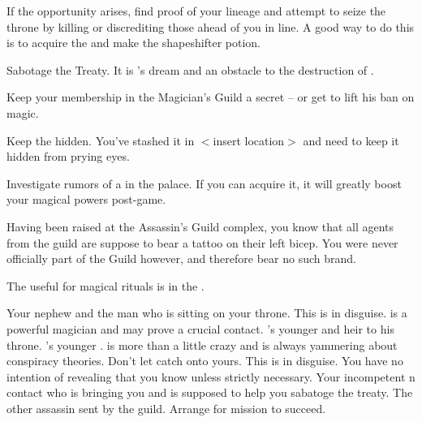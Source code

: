 \documentclass[char]{NeptuneBall}
\begin{document}
\begin{itemz}[Goals]
  \item If the opportunity arises, find proof of your lineage and attempt to seize the throne by killing or discrediting those ahead of you in line. A good way to do this is to acquire the \iHemlock{} and make the shapeshifter potion.
  \item Sabotage the Treaty. It is \cKing{}'s dream and an obstacle to the destruction of \pAtlantis{}.
  \item Keep your membership in the Magician's Guild a secret -- or get \cKing{\King} \cKing{} to lift his ban on magic.
  \item Keep the \iMusicBox{} hidden. You've stashed it in $<$insert location$>$ and need to keep it hidden from prying eyes.
  \item Investigate rumors of a \iGlowShell{\MYname} in the palace. If you can acquire it, it will greatly boost your magical powers post-game.
\end{itemz}

\begin{itemz}[Notes]
  \item Having been raised at the Assassin's Guild complex, you know that all agents from the guild are suppose to bear a tattoo on their left bicep. You were never officially part of the Guild however, and therefore bear no such brand.
	\item The \sRunicCircle{} useful for magical rituals is in the \pCaves{}.
\end{itemz}

\begin{contacts}
  \contact{\cKing{}} Your nephew and the man who is sitting on your throne.
  \contact{\cWitch{\MYname}} This is \cWitch{} in disguise. \cWitch{\They} is a powerful magician and may prove a crucial contact.
  \contact{\cPrincess{}} \cKing{}'s younger \cPrincess{\offspring} and heir to his throne.
  \contact{\cPlant{}} \cKing{}'s younger \cPlant{\sibling}. \cPlant{\they} is more than a little crazy and is always yammering about conspiracy theories. Don't let \cPlant{\them} catch onto yours.
  \contact{\cQueen{\MYname}} This is \cQueen{} in disguise. You have no intention of revealing that you know \cQueen{\them} unless strictly necessary.
  \contact{\cSpy{}} Your incompetent \pPacifica{}n contact who is bringing you \iHemlock{} and is supposed to help you sabatoge the treaty.
	\contact{\cDiplomat{}} The other assassin sent by the guild. Arrange for \cDiplomat{\their} mission to succeed.
\end{contacts}
\end{document}
